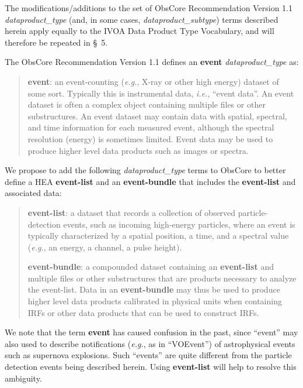 \documentclass[11pt,a4paper]{ivoa}
\begin{document}
The modifications/additions to the set of ObsCore Recommendation Version 1.1 \citep{2017ivoa.spec.0509L} {\em dataproduct\_type\/} (and, in some cases, {\em dataproduct\_subtype\/}) terms described herein apply equally to the IVOA Data Product Type Vocabulary, and will therefore be repeated in \S~5.

The ObsCore Recommendation Version 1.1 \citep{2017ivoa.spec.0509L} defines an {\bf event} {\em dataproduct\_type\/} as:

\begin{quote}
{\bf event}: an event-counting ({\em e.g.\/}, X-ray or other high energy) dataset of some sort. Typically this is instrumental data, {\em i.e.\/}, ``event data''.  An event dataset is often a complex object containing multiple files or other substructures. An event dataset may contain data with spatial, spectral, and time information for each measured event, although the spectral resolution (energy) is sometimes limited. Event data may be used to produce higher level data products such as images or spectra.
\end{quote}

We propose to add the following {\em dataproduct\_type\/} terms to ObsCore to better define a \gls{HEA} {\bf event-list} and an {\bf event-bundle} that includes the {\bf event-list} and associated data:

\begin{quote}
{\bf event-list}: a dataset that records a collection of observed particle-detection events, such as incoming high-energy particles, where an event is typically characterized by a spatial position, a time, and a spectral value ({\em e.g.\/}, an energy, a channel, a pulse height).

{\bf event-bundle}: a compounded dataset containing an {\bf event-list} and multiple files or other substructures that are products necessary to analyze the event-list. Data in an {\bf event-bundle} may thus be used to produce higher level data products calibrated in physical units when containing \glspl{IRF} or other data products that can be used to construct \glspl{IRF}.
\end{quote}

We note that the term {\bf event} has caused confusion in the past, since ``event'' may also used to describe notifications ({\em e.g.\/}, as in ``VOEvent'') of astrophysical events such as supernova explosions.  Such ``events'' are quite different from the particle detection events being described herein. Using {\bf event-list} will help to resolve this ambiguity.
\end{document}
